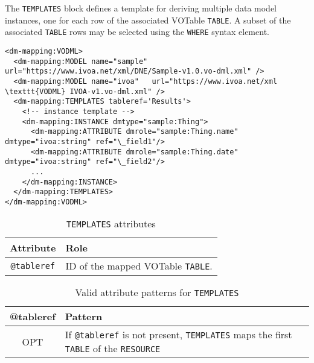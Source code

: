 The \texttt{TEMPLATES} block defines a template for deriving multiple data model instances,
one for each row of the associated VOTable \texttt{TABLE}.  A subset of the associated
\texttt{TABLE} rows may be selected using the \texttt{WHERE} syntax element.

\begin{lstlisting}[frame=single,caption={Example \texttt{TEMPLATES} block},style=XML,basicstyle=\tiny]
<dm-mapping:VODML>
  <dm-mapping:MODEL name="sample" url="https://www.ivoa.net/xml/DNE/Sample-v1.0.vo-dml.xml" />
  <dm-mapping:MODEL name="ivoa"   url="https://www.ivoa.net/xml \texttt{VODML} IVOA-v1.vo-dml.xml" />
  <dm-mapping:TEMPLATES tableref='Results'>
    <!-- instance template -->
    <dm-mapping:INSTANCE dmtype="sample:Thing">
      <dm-mapping:ATTRIBUTE dmrole="sample:Thing.name" dmtype="ivoa:string" ref="\_field1"/>
      <dm-mapping:ATTRIBUTE dmrole="sample:Thing.date" dmtype="ivoa:string" ref="\_field2"/>
      ...
    </dm-mapping:INSTANCE>
  </dm-mapping:TEMPLATES>
</dm-mapping:VODML>
\end{lstlisting}

\begin{table}[!htbp]
  \small
  \centering
  \begin{tabulary}{\linewidth}{|c|J|}
    \hline 
         \textbf{Attribute} & 
         \textbf {Role}\\
    \hline
    \hline  
         \texttt{@tableref} & 
         ID of the mapped VOTable \texttt{TABLE}.\\
    \hline 
  \end{tabulary}
  \caption{\texttt{TEMPLATES} attributes} 
  \label{tbl:templates-att}
\end{table}

\begin{table}[!htbp]
  \small
  \centering
  \begin{tabulary}{\linewidth}{|c|J|}
    \hline 
        \textbf{@tableref} &
        \textbf{Pattern}\\
    \hline
    \hline  
        OPT &           
        If \texttt{@tableref} is not present, \texttt{TEMPLATES} maps the first \texttt{TABLE} of the \texttt{RESOURCE}\\
    \hline 
  \end{tabulary}
  \caption{Valid attribute patterns for  \texttt{TEMPLATES}} 
  \label{tbl:templates-pattern}
 \end{table}

